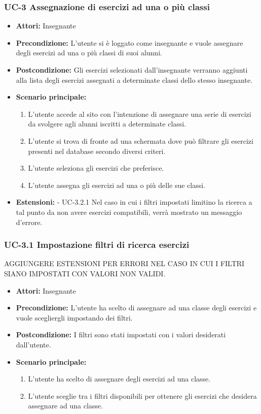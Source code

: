 \subsubsection{UC-3 Assegnazione di esercizi ad una o più classi}
	\begin{itemize}
		\item \textbf{Attori: } Insegnante
		\item \textbf{Precondizione: } L'utente si è loggato come insegnante e vuole assegnare degli esercizi ad una o più classi di suoi alunni. 
		\item \textbf{Postcondizione: } Gli esercizi selezionati dall'insegnante verranno aggiunti alla lista degli esercizi assegnati a determinate classi dello stesso insegnante.
		\item \textbf{Scenario principale: } 
		\begin{enumerate}
			\item L'utente accede al sito con l'intenzione di assegnare una serie di esercizi da svolgere agli alunni iscritti a determinate classi. 
			\item L'utente si trova di fronte ad una schermata dove può filtrare gli esercizi presenti nel database secondo diversi criteri.
			\item L'utente seleziona gli esercizi che preferisce.
			\item L'utente assegna gli esercizi ad una o più delle sue classi. 
		\end{enumerate} 
		\item \textbf{Estensioni: }
		- UC-3.2.1 Nel caso in cui i filtri impostati limitino la ricerca a tal punto da non avere esercizi compatibili, verrà mostrato un messaggio d'errore. 
	\end{itemize}
\subsubsection{UC-3.1 Impostazione filtri di ricerca esercizi}

AGGIUNGERE ESTENSIONI PER ERRORI NEL CASO IN CUI I FILTRI SIANO IMPOSTATI CON VALORI NON VALIDI.
\begin{itemize}
		\item \textbf{Attori: } Insegnante
		\item \textbf{Precondizione: }L'utente ha scelto di assegnare ad una classe degli esercizi e vuole scegliergli impostando dei filtri.	
		\item \textbf{Postcondizione: }I filtri sono stati impostati con i valori desiderati dall'utente.
		\item \textbf{Scenario principale: }
		\begin{enumerate}
			\item L'utente ha scelto di assegnare degli esercizi ad una classe. 				\item L'utente sceglie tra i filtri disponibili per ottenere gli esercizi che desidera assegnare ad una classe.
		\end{enumerate}
\end{itemize}
